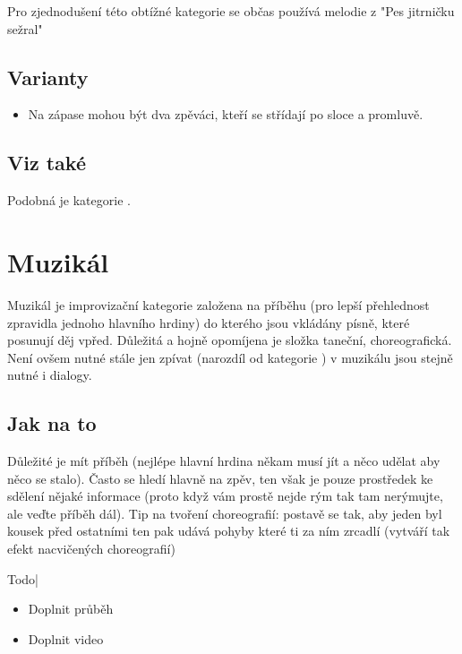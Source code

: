 \documentclass[main.tex]{subfiles}
\begin{document}
Pro zjednodušení této obtížné kategorie se občas používá melodie z "Pes jitrničku sežral" 
 
\subsection{Varianty} \begin{itemize}
\item  Na zápase mohou být dva zpěváci, kteří se střídají po sloce a promluvě.
\end{itemize}
 
\subsection{Viz také} Podobná je kategorie . 
 
 
 
 
 
\needspace{5cm} \section{Muzikál} \label{muzikál}  
 
Muzikál je improvizační kategorie založena na příběhu (pro lepší přehlednost zpravidla jednoho hlavního hrdiny) do kterého jsou vkládány písně, které posunují děj vpřed. Důležitá a hojně opomíjena je složka taneční, choreografická. Není ovšem nutné stále jen zpívat (narozdíl od kategorie ) v muzikálu jsou stejně nutné i dialogy. 
 
\subsection{Jak na to}  
Důležité je mít příběh (nejlépe hlavní hrdina někam musí jít a něco udělat aby něco se stalo). Často se hledí hlavně na zpěv, ten však je pouze prostředek ke sdělení nějaké informace (proto když vám prostě nejde rým tak tam nerýmujte, ale veďte příběh dál). Tip na tvoření choreografií: postavě se tak, aby jeden byl kousek před ostatními ten pak udává pohyby které ti za ním zrcadlí (vytváří tak efekt nacvičených choreografií) 
 
{{Todo| 
\begin{itemize}
\item  Doplnit průběh
\item  Doplnit video
\end{itemize}
}} 
 
 
 
\end{document}
